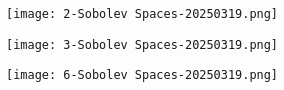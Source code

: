 \begin{theorem}
\begin{figure}[H]
\centering
\texttt{[image: 2-Sobolev Spaces-20250319.png]}
\label{}
\end{figure}
\begin{figure}[H]
\centering
\texttt{[image: 3-Sobolev Spaces-20250319.png]}
\label{}
\end{figure}
\end{theorem}
\begin{theorem}[内插不等式]
\begin{figure}[H]
\centering
\texttt{[image: 6-Sobolev Spaces-20250319.png]}
\label{}
\end{figure}
\end{theorem}
